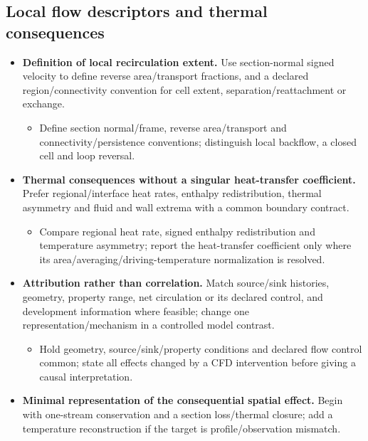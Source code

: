 \subsection{Local flow descriptors and thermal consequences}\label{subsec:local-flow-descriptors-and-thermal-consequences}
\begin{itemize}[leftmargin=*]

\item {}\textbf{Definition of local recirculation extent.} Use section-normal signed velocity to define reverse area/\allowbreak{}transport fractions, and a declared region/\allowbreak{}connectivity convention for cell extent, separation/\allowbreak{}reattachment or exchange.
\begin{itemize}
\item Define section normal/\allowbreak{}frame, reverse area/\allowbreak{}transport and connectivity/\allowbreak{}persistence conventions; distinguish local backflow, a closed cell and loop reversal.
\end{itemize}
\item {}\textbf{Thermal consequences without a singular heat-transfer coefficient.} Prefer regional/\allowbreak{}interface heat rates, enthalpy redistribution, thermal asymmetry and fluid and wall extrema with a common boundary contract.
\begin{itemize}
\item Compare regional heat rate, signed enthalpy redistribution and temperature asymmetry; report the heat-transfer coefficient only where its area/\allowbreak{}averaging/\allowbreak{}driving-temperature normalization is resolved.
\end{itemize}
\item {}\textbf{Attribution rather than correlation.} Match source/\allowbreak{}sink histories, geometry, property range, net circulation or its declared control, and development information where feasible; change one representation/\allowbreak{}mechanism in a controlled model contrast.
\begin{itemize}
\item Hold geometry, source/\allowbreak{}sink/\allowbreak{}property conditions and declared flow control common; state all effects changed by a CFD intervention before giving a causal interpretation.
\end{itemize}
\item {}\textbf{Minimal representation of the consequential spatial effect.} Begin with one-stream conservation and a section loss/\allowbreak{}thermal closure; add a temperature reconstruction if the target is profile/\allowbreak{}observation mismatch.

\end{itemize}
